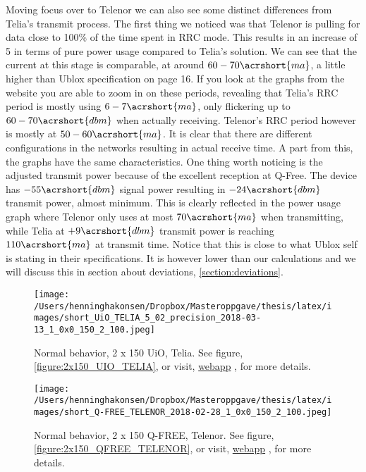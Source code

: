 \documentclass[USenglish]{ifimaster}  %
\begin{document}
Moving focus over to Telenor we can also see some distinct differences from Telia's transmit process. The first thing we noticed was that Telenor is pulling for data close to 100\% of the time spent in RRC mode. This results in an increase of 5 in terms of pure power usage compared to Telia's solution. We can see that the current at this stage is comparable, at around ${60-70 \acrshort{ma}}$, a little higher than Ublox specification on page 16\cite{datasheet:ubloxchip}. If you look at the graphs from the website you are able to zoom in on these periods, revealing that Telia's RRC period is mostly using ${6-7 \acrshort{ma}}$, only flickering up to ${60-70 \acrshort{dbm}}$ when actually receiving. Telenor's RRC period however is mostly at ${50-60 \acrshort{ma}}$. It is clear that there are different configurations in the networks resulting in actual receive time. A part from this, the graphs have the same characteristics. One thing worth noticing is the adjusted transmit power because of the excellent reception at Q-Free. The device has ${-55 \acrshort{dbm}}$ signal power resulting in ${-24 \acrshort{dbm}}$ transmit power, almost minimum. This is clearly reflected in the power usage graph where Telenor only uses at most ${70 \acrshort{ma}}$ when transmitting, while Telia at ${+9 \acrshort{dbm}}$ transmit power is reaching ${110 \acrshort{ma}}$ at transmit time. Notice that this is close to what Ublox self is stating in their specifications. It is however lower than our calculations and we will discuss this in section about deviations, \vref{section:deviations}.

\begin{figure}[H]
  \centering
  \texttt{[image: /Users/henninghakonsen/Dropbox/Masteroppgave/thesis/latex/images/short\_UiO\_TELIA\_5\_02\_precision\_2018-03-13\_1\_0x0\_150\_2\_100.jpeg]}
  \caption{Normal behavior, 2 x 150 UiO, Telia. See figure, \vref{figure:2x150_UIO_TELIA}, or visit, \href{http://158.39.77.97:9000/\#/results/Q-FREE\_TELENOR\_2018-02-28\_1\_0x0\_150\_2\_100}{webapp} \cite{online:result1}, for more details.}
  \label{figure:2x150_UIO_TELIA_SHORT}
\end{figure}

\begin{figure}[H]
  \centering
  \texttt{[image: /Users/henninghakonsen/Dropbox/Masteroppgave/thesis/latex/images/short\_Q-FREE\_TELENOR\_2018-02-28\_1\_0x0\_150\_2\_100.jpeg]}
  \caption{Normal behavior, 2 x 150 Q-FREE, Telenor. See figure, \vref{figure:2x150_QFREE_TELENOR}, or visit, \href{http://158.39.77.97:9000/\#/results/Q-FREE\_TELENOR\_5.02\_2018-03-07\_0\_0x0\_40\_1\_200}{webapp} \cite{online:result2}, for more details.}
  \label{figure:2x150_QFREE_TELENOR_SHORT}
\end{figure}
\end{document}
